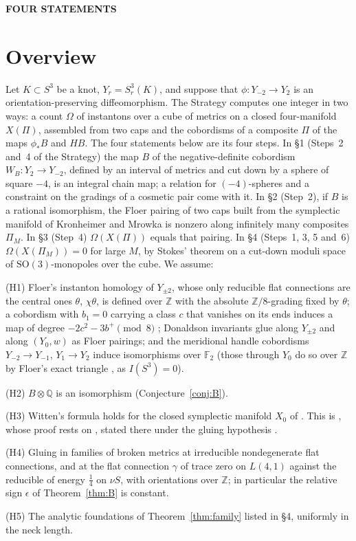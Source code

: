 \documentclass[10pt]{amsart}
\numberwithin{equation}{section}
\theoremstyle{compact}
\newcommand{\Z}{\mathbb Z}
\newcommand{\Q}{\mathbb Q}
\newcommand{\F}{\mathbb F}
\newcommand{\SO}{\mathrm{SO}}
\newcommand{\hyp}[1]{\par\noindent\textup{#1}\enspace}
\begin{document}
{\centering\bfseries FOUR STATEMENTS\par}

\section*{Overview}

Let $K\subset S^3$ be a knot, $Y_r=S^3_r(K)$, and suppose that
$\phi\colon Y_{-2}\to Y_2$ is an orientation-preserving diffeomorphism. The
Strategy computes one integer in two ways: a count $\Omega$ of instantons over
a cube of metrics on a closed four-manifold $X(\Pi)$, assembled from two caps
and the cobordisms of a composite $\Pi$ of the maps $\phi_*B$ and $HB$. The four
statements below are its four steps. In \S1 (Steps~2 and~4 of the Strategy)
the map $B$ of the negative-definite cobordism $W_B\colon Y_2\to Y_{-2}$, defined
by an interval of metrics and cut down by a sphere of square $-4$, is an
integral chain map; a relation for $(-4)$-spheres and a constraint on the
gradings of a cosmetic pair come with it. In \S2 (Step~2), if $B$ is a rational
isomorphism, the Floer pairing of two caps built from the symplectic manifold
of Kronheimer and Mrowka is nonzero along infinitely many composites $\Pi_M$.
In \S3 (Step~4) $\Omega(X(\Pi))$ equals that pairing. In \S4 (Steps~1, 3, 5
and~6) $\Omega(X(\Pi_M))=0$ for large $M$, by Stokes' theorem on a cut-down
moduli space of $\SO(3)$-monopoles over the cube. We assume:

\hyp{(H1)} Floer's instanton homology of $Y_{\pm2}$, whose only reducible flat
connections are the central ones $\theta$, $\chi\theta$, is defined over $\Z$
with the absolute $\Z/8$-grading fixed by $\theta$; a cobordism with $b_1=0$
carrying a class $c$ that vanishes on its ends induces a map of degree
$-2c^2-3b^+\pmod 8$ \cite[proof of Prop.~3.4]{DLME}; Donaldson invariants glue
along $Y_{\pm2}$ and along $(Y_0,w)$ as Floer pairings; and the meridional
handle cobordisms $Y_{-2}\to Y_{-1}$, $Y_1\to Y_2$ induce isomorphisms over
$\F_2$ (those through $Y_0$ do so over $\Z$ by Floer's exact triangle
\cite[Prop.~3.8]{DLME}, as $I(S^3)=0$).
\hyp{(H2)} $B\otimes\Q$ is an isomorphism (Conjecture~\ref{conj:B}).
\hyp{(H3)} Witten's formula holds for the closed symplectic manifold $X_0$ of
\cite[Prop.~15]{KM04}. This is \cite[Cor.~7]{KM04}, whose proof rests on
\cite[Thm.~1.1]{FLM}, stated there under the gluing hypothesis
\cite[Hyp.~7.8.1]{FLM}.
\hyp{(H4)} Gluing in families of broken metrics at irreducible nondegenerate
flat connections, and at the flat connection $\gamma$ of trace zero on
$L(4,1)$ against the reducible of energy $\frac14$ on $\nu S$, with
orientations over $\Z$; in particular the relative sign $\epsilon$ of
Theorem~\ref{thm:B} is constant.
\hyp{(H5)} The analytic foundations of Theorem~\ref{thm:family} listed in \S4,
uniformly in the neck length.
\end{document}
